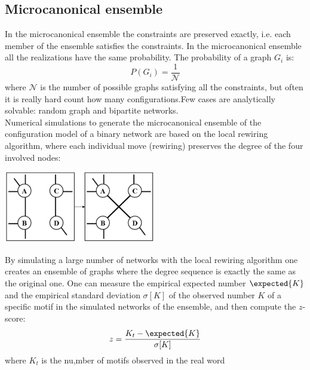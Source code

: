 \subsection{Microcanonical ensemble}
In the microcanonical ensemble the constraints are preserved exactly, i.e. each member of the ensemble satisfies the constraints. In the microcanonical ensemble all the realizations have the same probability. The
probability of a graph $G_i$ is:
\[
P(G_i) = \frac{1}{\mathcal{N}}
\]
where $\mathcal{N}$ is the number of possible graphs satisfying all the constraints, but often it is really hard count how many configurations.Few cases are analytically solvable: random graph and bipartite networks.\\
Numerical simulations to generate the microcanonical ensemble of the configuration model of a binary network are based on the local rewiring algorithm, where each individual move (rewiring) preserves the degree of the four involved nodes:
\begin{center}
	\includegraphics[width=0.5\textwidth]{picture/(43)local_rewiring.png}
\end{center}
By simulating a large number of networks with the local rewiring algorithm one creates an ensemble of graphs where the degree sequence is exactly the same as the original one. One can measure the empirical expected number $\expected{K}$ and the empirical standard deviation $\sigma[K]$ of the observed number $K$ of a specific motif in the simulated networks of the ensemble, and then compute the $z$-score:
\[
z = \frac{K_t - \expected{K}}{\sigma[K]}
\]
where $K_t$ is the nu,mber of motifs observed in the real word
